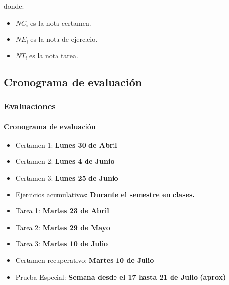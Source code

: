 \documentclass{beamer}
\begin{document}
			\begin{frame}
				\begin{center}

donde:
				\begin{itemize}

					\item[] $NC_{i}$ es la nota certamen.
					\item[] $NE_{i}$ es la nota de ejercicio.
					\item[] $NT_{i}$ es la nota tarea.
				\end{itemize}
			\end{center}
		\end{frame}



		\subsection{Cronograma de evaluaci\'on}


		\begin{frame}
			\frametitle{Evaluaciones}
			\framesubtitle{Cronograma de evaluaci\'on}

			\begin{itemize}
				\item Certamen 1: \textbf{Lunes 30 de Abril}
				\item Certamen 2: \textbf{Lunes 4 de Junio}
				\item Certamen 3: \textbf{Lunes 25 de Junio}
				\item Ejercicios acumulativos: \textbf{Durante el semestre en clases.}
				\item Tarea 1: \textbf{Martes 23 de Abril}
				\item Tarea 2: \textbf{Martes 29 de Mayo}
				\item Tarea 3: \textbf{Martes 10 de Julio}
				\item Certamen recuperativo: \textbf{Martes 10 de Julio}
				\item Prueba Especial: \textbf{Semana desde el 17 hasta 21 de Julio (aprox)}
			\end{itemize}

		\end{frame}
\end{document}
